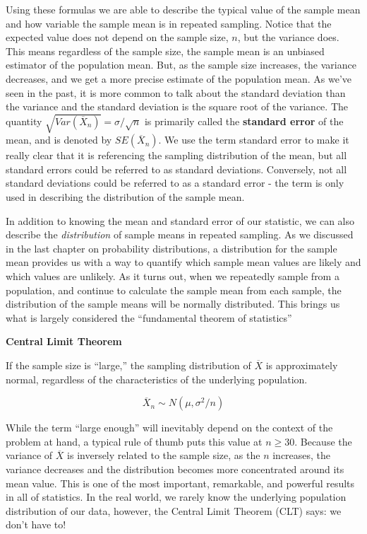 \documentclass[
]{book}
\theoremstyle{definition}
\theoremstyle{definition}
\theoremstyle{definition}
\theoremstyle{remark}
\begin{document}
Using these formulas we are able to describe the typical value of the sample mean and how variable the sample mean is in repeated sampling. Notice that the expected value does not depend on the sample size, \(n\), but the variance does. This means regardless of the sample size, the sample mean is an unbiased estimator of the population mean. But, as the sample size increases, the variance decreases, and we get a more precise estimate of the population mean. As we've seen in the past, it is more common to talk about the standard deviation than the variance and the standard deviation is the square root of the variance. The quantity \(\sqrt{Var(\overline{X}_n)} = \sigma / \sqrt{n}\) is primarily called the \textbf{standard error} of the mean, and is denoted by \(SE(\overline{X}_n)\). We use the term standard error to make it really clear that it is referencing the sampling distribution of the mean, but all standard errors could be referred to as standard deviations. Conversely, not all standard deviations could be referred to as a standard error - the term is only used in describing the distribution of the sample mean.

In addition to knowing the mean and standard error of our statistic, we can also describe the \emph{distribution} of sample means in repeated sampling. As we discussed in the last chapter on probability distributions, a distribution for the sample mean provides us with a way to quantify which sample mean values are likely and which values are unlikely. As it turns out, when we repeatedly sample from a population, and continue to calculate the sample mean from each sample, the distribution of the sample means will be normally distributed. This brings us what is largely considered the ``fundamental theorem of statistics''

\textbf{Central Limit Theorem}

If the sample size is ``large,'' the sampling distribution of \(\overline{X}\) is approximately normal, regardless of the characteristics of the underlying population.

\[\overline{X}_n \sim N(\mu, \sigma^2/n)\]

While the term ``large enough'' will inevitably depend on the context of the problem at hand, a typical rule of thumb puts this value at \(n \geq 30\). Because the variance of \(\overline{X}\) is inversely related to the sample size, as the \(n\) increases, the variance decreases and the distribution becomes more concentrated around its mean value. This is one of the most important, remarkable, and powerful results in all of statistics. In the real world, we rarely know the underlying population distribution of our data, however, the Central Limit Theorem (CLT) says: we don't have to!
\end{document}
